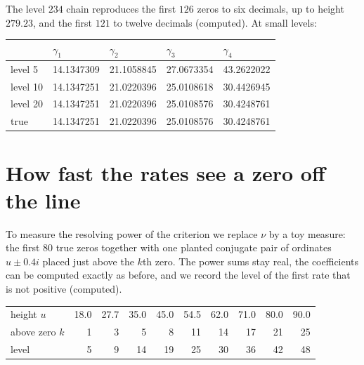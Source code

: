 \begin{remark}\label{b:comp:zeros}
The level $234$ chain reproduces the first $126$ zeros to six decimals, up to height $279.23$, and the first $121$ to twelve decimals (computed). At small levels:

\smallskip
\begin{center}\small
\begin{tabular}{@{}lllll@{}}
\toprule
 & $\gamma_1$ & $\gamma_2$ & $\gamma_3$ & $\gamma_4$\\
\midrule
level 5 & 14.1347309 & 21.1058845 & 27.0673354 & 43.2622022\\
level 10 & 14.1347251 & 21.0220396 & 25.0108618 & 30.4426945\\
level 20 & 14.1347251 & 21.0220396 & 25.0108576 & 30.4248761\\
true & 14.1347251 & 21.0220396 & 25.0108576 & 30.4248761\\
\bottomrule
\end{tabular}
\end{center}
\end{remark}

\section{How fast the rates see a zero off the line}\label{b:sec:toy}

To measure the resolving power of the criterion we replace $\nu$ by a toy measure: the first $80$ true zeros together with one planted conjugate pair of ordinates $u\pm0.4i$ placed just above the $k$th zero. The power sums stay real, the coefficients can be computed exactly as before, and we record the level of the first rate that is not positive (computed).

\begin{center}\small
\begin{tabular}{@{}lrrrrrrrrr@{}}
\toprule
height $u$ & 18.0 & 27.7 & 35.0 & 45.0 & 54.5 & 62.0 & 71.0 & 80.0 & 90.0\\
above zero $k$ & 1 & 3 & 5 & 8 & 11 & 14 & 17 & 21 & 25\\
level & 5 & 9 & 14 & 19 & 25 & 30 & 36 & 42 & 48\\
\bottomrule
\end{tabular}
\end{center}

